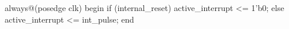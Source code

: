 \begin{vcode}
always@(posedge clk)
begin
    if (internal_reset)
        active_interrupt <= 1'b0;
    else
        active_interrupt <= int_pulse;
end
\end{vcode}

